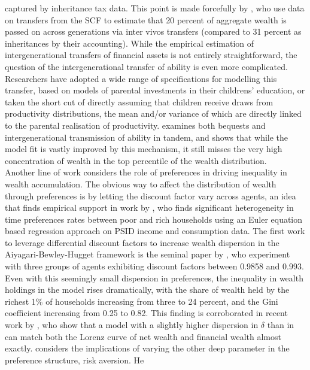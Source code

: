 captured by inheritance tax data. This point is made forcefully by 
\citet{GaleScholz1994}, who use data on transfers from the SCF to estimate that
20 percent of aggregate wealth is passed on across generations via inter vivos
transfers (compared to 31 percent as inheritances by their accounting). While
the empirical estimation of intergenerational transfers of financial assets is
not entirely straightforward, the question of the intergenerational transfer 
of ability is even more complicated. Researchers have adopted a wide range of 
specifications for modelling this transfer, based on models of parental 
investments in their childrens' education, or taken the short cut of directly 
assuming that children receive draws from productivity distributions, the 
mean and/or variance of which are directly linked to the parental realisation 
of productivity. \citet{DeNardi2004} examines both bequests and intergenerational
transmission of ability in tandem, and shows that while the model fit is vastly
improved by this mechanism, it still misses the very high concentration of 
wealth in the top percentile of the wealth distribution.
\vspace{0.5cm} \\
Another line of work considers the role of preferences in driving inequality in 
wealth accumulation. The obvious way to affect the distribution of wealth through
preferences is by letting the discount factor vary across agents, an idea that 
finds empirical support in work by \citet{Lawrance1991}, who finds significant
heterogeneity in time preferences rates between poor and rich households using 
an Euler equation based regression approach on PSID income and consumption data.
The first work to leverage differential discount factors to increase wealth 
dispersion in the Aiyagari-Bewley-Hugget framework is the seminal paper by
\citet{KrusellSmith1998}, who experiment with three groups of agents exhibiting
discount factors between 0.9858 and 0.993. Even with this seemingly small dispersion
in preferences, the inequality in wealth holdings in the model rises dramatically,
with the share of wealth held by the richest 1\% of households increasing from 
three to 24 percent, and the Gini coefficient increasing from 0.25 to 0.82.
This finding is corroborated in recent work by \citet{CarrollSlacalekTokuoka2014AER},
who show that a model with a slightly higher dispersion in $\delta$ than in 
\citet{KrusellSmith1998} can match both the Lorenz curve of net wealth and 
financial wealth almost exactly. \citet{Cozzi2014} considers the implications of
varying the other deep parameter in the preference structure, risk aversion. He
